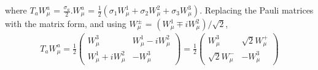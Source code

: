 where $T_{a}W_{\mu}^{a}$ = $\frac{\sigma_{a}}{2}.W_{\mu}^{a}$ = $\frac{1}{2}(\sigma_{1}W_{\mu}^{1} + \sigma_{2}W_{\mu}^{2} + \sigma_{3}W_{\mu}^{3})$. Replacing the 
Pauli matrices with the matrix form, and using $W_{\mu}^{\pm}$ = $(W_{\mu}^{1} \mp iW_{\mu}^{2})/{\sqrt{2}}$,  
\begin{equation}
  \begin{split}
     T_{a}W_{\mu}^{a} = \frac{1}{2}\left(\begin{array}{lr} W_{\mu}^{3}  &W_{\mu}^{1} - iW_{\mu}^{2} \\ W_{\mu}^{1} + iW_{\mu}^{2}  & -W_{\mu}^{3} \end{array} \right) =
    \frac{1}{2}\left(\begin{array}{lr} W_{\mu}^{3}  &\sqrt{2}W_{\mu}^{+} \\ \sqrt{2}W_{\mu}^{-} & -W_{\mu}^{3} \end{array} \right)
\label{eg:Wmus}
\end{split} 
\end{equation}

